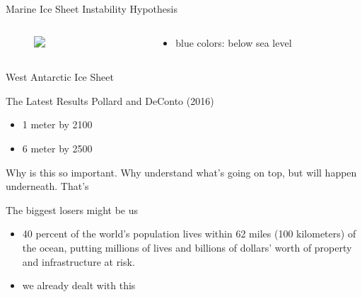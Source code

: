 \documentclass[hide notes,intlimits]{beamer}
\begin{document}
\begin{frame}{Marine Ice Sheet Instability Hypothesis}
  \begin{columns}[c]
    \begin{column}{.65\linewidth}
      \begin{figure}
        \includegraphics<1>[height=8cm]{ant-marine}
      \end{figure}
    \end{column}
    \begin{column}{.38\linewidth}
      \begin{itemize}
      \item blue colors: below sea level
      \end{itemize}
    \end{column}
  \end{columns}
\end{frame}

\begin{frame}{West Antarctic Ice Sheet}
\end{frame}

\begin{frame}{The Latest Results}
  Pollard and DeConto (2016)
  \begin{itemize}
  \item 1 meter by 2100
  \item 6 meter by 2500
  \end{itemize}
Why is this so important. Why understand what's going on top, but will happen underneath. That's 
\end{frame}


\begin{frame}{The biggest losers might be us}
\begin{itemize}
\item 40 percent of the world's population lives within 62 miles (100 kilometers) of the ocean, putting millions of lives and billions of dollars' worth of property and infrastructure at risk. 
\item we already dealt with this
\end{itemize}
\end{frame}
\end{document}
